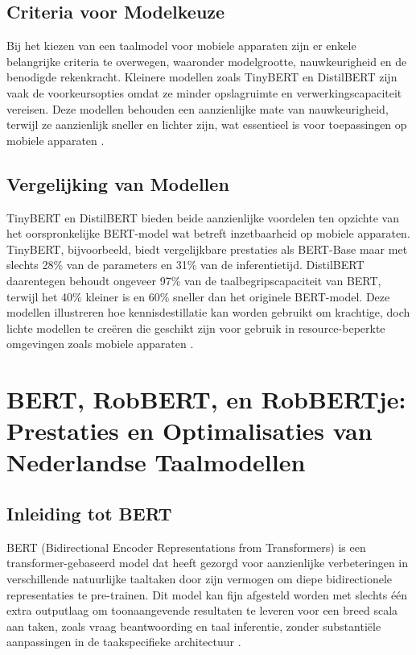 \subsection{Criteria voor Modelkeuze}

Bij het kiezen van een taalmodel voor mobiele apparaten zijn er enkele belangrijke criteria te overwegen, waaronder modelgrootte, nauwkeurigheid en de benodigde rekenkracht. Kleinere modellen zoals TinyBERT en DistilBERT zijn vaak de voorkeursopties omdat ze minder opslagruimte en verwerkingscapaciteit vereisen. Deze modellen behouden een aanzienlijke mate van nauwkeurigheid, terwijl ze aanzienlijk sneller en lichter zijn, wat essentieel is voor toepassingen op mobiele apparaten \autocite{Sun2020MobileBERT}.

\subsection{Vergelijking van Modellen}

TinyBERT en DistilBERT bieden beide aanzienlijke voordelen ten opzichte van het oorspronkelijke BERT-model wat betreft inzetbaarheid op mobiele apparaten. TinyBERT, bijvoorbeeld, biedt vergelijkbare prestaties als BERT-Base maar met slechts 28\% van de parameters en 31\% van de inferentietijd. DistilBERT daarentegen behoudt ongeveer 97\% van de taalbegripscapaciteit van BERT, terwijl het 40\% kleiner is en 60\% sneller dan het originele BERT-model. Deze modellen illustreren hoe kennisdestillatie kan worden gebruikt om krachtige, doch lichte modellen te creëren die geschikt zijn voor gebruik in resource-beperkte omgevingen zoals mobiele apparaten \autocite{Sanh2019DistilBERT}.


\section{BERT, RobBERT, en RobBERTje: Prestaties en Optimalisaties van Nederlandse Taalmodellen}

\subsection{Inleiding tot BERT}

BERT (Bidirectional Encoder Representations from Transformers) is een trans\-for\-mer-gebaseerd model dat heeft gezorgd voor aanzienlijke verbeteringen in verschillende natuurlijke taaltaken door zijn vermogen om diepe bidirectionele representaties te pre-trainen. Dit model kan fijn afgesteld worden met slechts één extra outputlaag om toonaangevende resultaten te leveren voor een breed scala aan taken, zoals vraag beantwoording en taal inferentie, zonder substantiële aanpassingen in de taakspecifieke architectuur \autocite{Devlin2019}.

